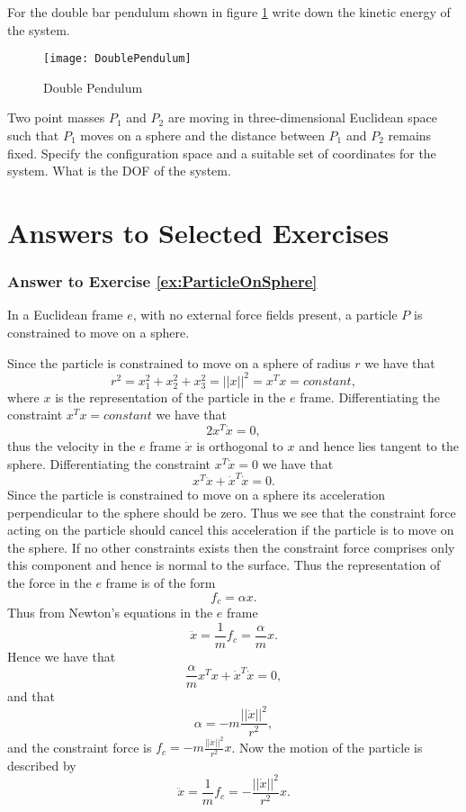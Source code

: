 \documentclass[graybox,envcountchap,sectrefs]{svmonoMuga}
\begin{document}
\begin{exercise}
For the double bar pendulum shown in figure \ref{Fig:DoublePendulum} write down the kinetic energy of the system.
\begin{figure}[ht]
\begin{center}
\texttt{[image: DoublePendulum]}
\renewcommand{\baselinestretch}{1}\selectfont
\caption{Double Pendulum}
\label{Fig:DoublePendulum}
\renewcommand{\baselinestretch}{1.5}\selectfont
\end{center}
\end{figure}
\end{exercise}

\begin{exercise}\label{ex:ConstrainedParticleMotion}
Two point masses $P_1$ and $P_2$ are moving in three-dimensional Euclidean space such that $P_1$ moves on a sphere and the distance between $P_1$ and $P_2$ remains 
fixed. Specify the configuration space and a suitable set of coordinates for the system. What is the DOF of the system.
\end{exercise}


\newpage
\chapter{Answers to Selected Exercises}

\subsection*{Answer to Exercise \ref{ex:ParticleOnSphere}}
In a Euclidean frame $e$, with no external force fields present, a particle $P$ is constrained to move on a sphere.

Since the particle is constrained to move on a sphere of radius $r$ we have that
\[r^2=x_1^2+x_2^2+x_3^2=||x||^2=x^Tx=constant,\]
where $x$ is the representation of the particle in the $e$ frame.
Differentiating the constraint $x^Tx=constant$ we have that
\[2x^T\dot{x}=0,\]
thus the velocity in the $e$ frame $\dot{x}$ is orthogonal to $x$ and hence lies tangent to the sphere.
Differentiating the constraint $x^T\dot{x}=0$ we have that
\[
x^T\ddot{x}+\dot{x}^T\dot{x}=0.
\]
Since the particle is constrained to move on a sphere its acceleration perpendicular to the sphere should be zero. Thus we see that the constraint force acting on the particle should cancel this acceleration if the particle is to move on the sphere.  If no other constraints exists then the constraint force comprises only this component and hence is normal to the surface. Thus 
the representation of the force in the $e$ frame is of the form
\[
f_c=\alpha x.
\]
Thus from Newton's equations in the $e$ frame
\[
\ddot{x}=\frac{1}{m}f_c=\frac{\alpha}{m}x.
\]
Hence we have that
\[
\frac{\alpha}{m}x^Tx+\dot{x}^T\dot{x}=0,
\]
and that
\[
\alpha=-m\frac{||\dot{x}||^2}{r^2},
\]
and the constraint force is $f_c=-m\frac{||\dot{x}||^2}{r^2}x$.
Now the motion of the particle is described by
\[
\ddot{x}=\frac{1}{m}f_c=-\frac{||\dot{x}||^2}{r^2}x.
\]
\end{document}
